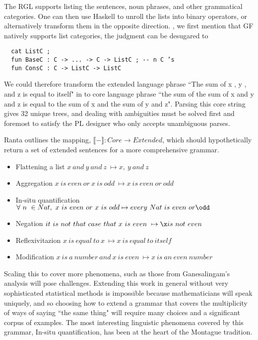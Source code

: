 The RGL supports listing the sentences, noun phrases, and other grammatical
categories. One can then use Haskell to unroll the lists into binary operators, or
alternatively transform them in the opposite direction. , we first mention that
GF natively supports list categories, the judgment  can be
desugared to

\begin{verbatim}
  cat ListC ;
  fun BaseC : C -> ... -> C -> ListC ; -- n C ’s
  fun ConsC : C -> ListC -> ListC
\end{verbatim}

We could therefore transform the extended language phrase ``The sum of x , y ,
and z is equal to itself" in to core language phrase ``the sum of the sum of x
and y and z is equal to the sum of x and the sum of y and z". Parsing this core
string gives 32 unique trees, and dealing with ambiguities must be solved first
and foremost to satisfy the PL designer who only accepts unambiguous parses.

Ranta outlines the mapping, $\llbracket - \rrbracket : Core \to Extended$,
which should hypothetically return a set of extended sentences for a more
comprehensive grammar.

\begin{itemize}
\item Flattening a list
  $x\ and\ y\ and\ z\ \mapsto x,\ y\ and\ z$
\item Aggregation
  $x\ is\ even\ or\ x\ is\ odd\ \mapsto x\ is\ even\ or\ odd$
\item In-situ quantification \\
  $\forall\ n\ \in Nat,\ x\ is\ even\ or\ x\ is\ odd \mapsto every\ Nat\ is\ even\ or \odd$
\item Negation
  $it\ is\ not\ that\ case\ that\ x\ is\ even\ \mapsto \x is\ not\ even$
\item Reflexivitazion
  $x\ is\ equal\ to\ x\ \mapsto x\ is\ equal\ to\ itself$
\item Modification
  $x\ is\ a\ number\ and\ x\ is\ even\ \mapsto x\ is\ an\ even\ number$
\end{itemize}

Scaling this to cover more phenomena, such as those from Ganesalingam's analysis
will pose challenges. Extending this work in general without very sophisticated
statistical methods is impossible because mathematicians will speak uniquely,
and so choosing how to extend a grammar that covers the multiplicity of ways of
saying ``the same thing" will require many choices and a significant corpus of
examples. The most interesting linguistic phenomena covered by this grammar,
In-situ quantification, has been at the heart of the Montague tradition.

